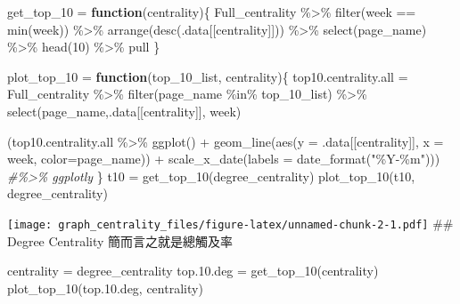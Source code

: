 \documentclass[
]{article}
\newenvironment{Shaded}{\begin{snugshade}}{\end{snugshade}}
\newcommand{\AttributeTok}[1]{\textcolor[rgb]{0.77,0.63,0.00}{#1}}
\newcommand{\CommentTok}[1]{\textcolor[rgb]{0.56,0.35,0.01}{\textit{#1}}}
\newcommand{\ControlFlowTok}[1]{\textcolor[rgb]{0.13,0.29,0.53}{\textbf{#1}}}
\newcommand{\DecValTok}[1]{\textcolor[rgb]{0.00,0.00,0.81}{#1}}
\newcommand{\FloatTok}[1]{\textcolor[rgb]{0.00,0.00,0.81}{#1}}
\newcommand{\FunctionTok}[1]{\textcolor[rgb]{0.00,0.00,0.00}{#1}}
\newcommand{\NormalTok}[1]{#1}
\newcommand{\OtherTok}[1]{\textcolor[rgb]{0.56,0.35,0.01}{#1}}
\newcommand{\SpecialCharTok}[1]{\textcolor[rgb]{0.00,0.00,0.00}{#1}}
\newcommand{\StringTok}[1]{\textcolor[rgb]{0.31,0.60,0.02}{#1}}
\begin{document}
\begin{Shaded}
\begin{Highlighting}[]
\NormalTok{get\_top\_10 }\OtherTok{=} \ControlFlowTok{function}\NormalTok{(centrality)\{}
\NormalTok{  Full\_centrality }\SpecialCharTok{\%\textgreater{}\%} 
    \FunctionTok{filter}\NormalTok{(week }\SpecialCharTok{==} \FunctionTok{min}\NormalTok{(week)) }\SpecialCharTok{\%\textgreater{}\%} 
    \FunctionTok{arrange}\NormalTok{(}\FunctionTok{desc}\NormalTok{(.data[[centrality]])) }\SpecialCharTok{\%\textgreater{}\%} 
    \FunctionTok{select}\NormalTok{(page\_name) }\SpecialCharTok{\%\textgreater{}\%} \FunctionTok{head}\NormalTok{(}\DecValTok{10}\NormalTok{) }\SpecialCharTok{\%\textgreater{}\%}\NormalTok{ pull}
\NormalTok{\}}

\NormalTok{plot\_top\_10 }\OtherTok{=} \ControlFlowTok{function}\NormalTok{(top\_10\_list, centrality)\{}
\NormalTok{  top10.centrality.all }\OtherTok{=}\NormalTok{ Full\_centrality }\SpecialCharTok{\%\textgreater{}\%} \FunctionTok{filter}\NormalTok{(page\_name }\SpecialCharTok{\%in\%}\NormalTok{ top\_10\_list) }\SpecialCharTok{\%\textgreater{}\%} \FunctionTok{select}\NormalTok{(page\_name,.data[[centrality]], week)}
  
\NormalTok{  (top10.centrality.all }\SpecialCharTok{\%\textgreater{}\%} \FunctionTok{ggplot}\NormalTok{() }\SpecialCharTok{+} 
    \FunctionTok{geom\_line}\NormalTok{(}\FunctionTok{aes}\NormalTok{(}\AttributeTok{y =}\NormalTok{ .data[[centrality]], }\AttributeTok{x =}\NormalTok{ week, }\AttributeTok{color=}\NormalTok{page\_name)) }\SpecialCharTok{+}
    \FunctionTok{scale\_x\_date}\NormalTok{(}\AttributeTok{labels =} \FunctionTok{date\_format}\NormalTok{(}\StringTok{"\%Y{-}\%m"}\NormalTok{))) }\CommentTok{\#\%\textgreater{}\% ggplotly}
\NormalTok{\}}
\NormalTok{t10 }\OtherTok{=} \FunctionTok{get\_top\_10}\NormalTok{(}\StringTok{\textquotesingle{}degree\_centrality\textquotesingle{}}\NormalTok{)}
\FunctionTok{plot\_top\_10}\NormalTok{(t10, }\StringTok{\textquotesingle{}degree\_centrality\textquotesingle{}}\NormalTok{)}
\end{Highlighting}
\end{Shaded}

\texttt{[image: graph\_centrality\_files/figure-latex/unnamed-chunk-2-1.pdf]}
\#\# Degree Centrality 簡而言之就是總觸及率

\begin{Shaded}
\begin{Highlighting}[]
\NormalTok{centrality }\OtherTok{=} \StringTok{\textquotesingle{}degree\_centrality\textquotesingle{}}
\NormalTok{top.}\FloatTok{10.}\NormalTok{deg }\OtherTok{=} \FunctionTok{get\_top\_10}\NormalTok{(centrality)}
\FunctionTok{plot\_top\_10}\NormalTok{(top.}\FloatTok{10.}\NormalTok{deg, centrality)}
\end{Highlighting}
\end{Shaded}
\end{document}
